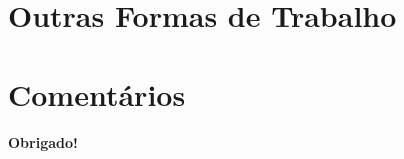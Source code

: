 \documentclass[11pt]{beamer}
\begin{document}



\section{Outras Formas de Trabalho}



\section{Comentários}


\frame
{
    \begin{center}
     \vfill
    \textbf{Obrigado!}
     \\

     \vfill
\end{center}
}
\end{document}
